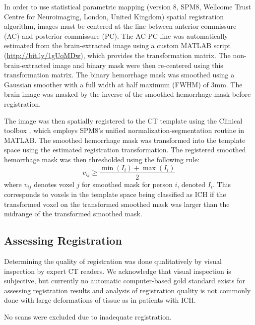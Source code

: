\documentclass[10pt]{article}\usepackage[]{graphicx}\usepackage[]{color}
\begin{document}
In order to use statistical parametric mapping (version 8, SPM8, Wellcome Trust Centre for Neuroimaging, London, United Kingdom) spatial registration algorithm, images must be centered at the line between anterior commissure (AC) and posterior commissure (PC).  The AC-PC line was automatically estimated from the brain-extracted image using a custom MATLAB script (\url{http://bit.ly/1gUqMDw}), which provides the transformation matrix. 
The non-brain-extracted image and binary mask were then re-centered using this transformation matrix.  The binary hemorrhage mask was smoothed using a Gaussian smoother with a full width at half maximum (FWHM) of $3$mm.  The brain image was masked by the inverse of the smoothed hemorrhage mask before registration. 


The image was then spatially registered to the CT template using the Clinical toolbox \citep{rorden_age-specific_2012}, which employs SPM8's unified normalization-segmentation routine \citep{ashburner_unified_2005} in MATLAB.  The smoothed hemorrhage mask was transformed into the template space using the estimated registration transformation.  The registered smoothed hemorrhage mask was then thresholded using the following rule:
$$
v_{ij} ≥ \frac{\min(I_i) + \max(I_i)}{2}
$$
where $v_{ij}$ denotes voxel $j$ for smoothed mask for person $i$, denoted $I_i$.  This corresponds to voxels in the template space being classified as ICH if the transformed voxel on the transformed smoothed mask was larger than the midrange of the transformed smoothed mask.  


\subsection*{Assessing Registration}

Determining the quality of registration was done qualitatively by visual inspection by expert CT readers.   We acknowledge that visual inspection is subjective, but currently no automatic computer-based gold standard exists for assessing
registration results and analysis of registration quality is not commonly done with large deformations of tissue as in patients with ICH.  

No scans were excluded due to inadequate registration.
\end{document}
